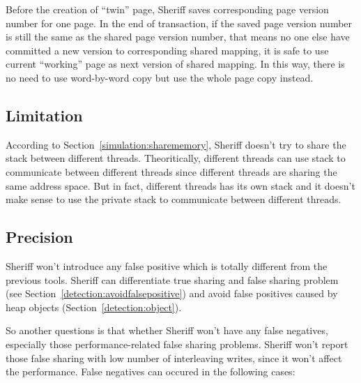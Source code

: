 \begin{enumerate}
Before the creation of ``twin'' page, Sheriff saves corresponding page version number for one page. 
In the end of transaction, if the saved page version number is still the same as the shared page version number, that means
no one else have committed a new version to corresponding shared mapping, it is safe to use current ``working'' page 
as next version of shared mapping. 
In this way, there is no need to use word-by-word copy but use the whole page copy instead.
\end{enumerate}

\subsection{Limitation}
According to Section~\ref{simulation:sharememory}, Sheriff doesn't try to share the stack between different threads. 
Theoritically, different threads can use stack to communicate between different threads since different threads are 
sharing the same address space. But in fact, different threads has its own stack and 
it doesn't make sense to use the private stack to communicate between different threads. 

\subsection{Precision}
Sheriff won't introduce any false positive which is totally different from the previous tools. Sheriff can differentiate 
true sharing and false sharing problem (see Section~\ref{detection:avoidfalsepositive}) and avoid false positives caused by heap objects (Section~\ref{detection:object}). 

So another questions is that whether Sheriff won't have any false negatives, especially 
those performance-related false sharing problems. 
Sheriff won't report those false sharing with low number of interleaving writes, since it won't affect the performance.
False negatives can occured in the following cases:

